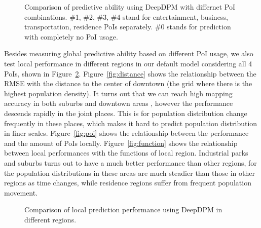 \documentclass[letterpaper]{article} %
\begin{document}
\begin{figure}[h]
    \centering

    \caption{Comparison of predictive ability using DeepDPM with differnet PoI combinations. \#1, \#2, \#3, \#4 stand for entertainment, business, transportation, residence PoIs separately. \#0 stands for prediction with completely no PoI usage.}
    \label{fig:poi_combination}
\end{figure}

Besides measuring global predictive ability based on different PoI usage, we also test local performance in different regions in our default model considering all 4 PoIs, shown in Figure~\ref{fig:variations}. Figure~\ref{fig:distance} shows the relationship between the RMSE with the distance to the center of downtown (the grid where there is the highest population density). It turns out that we can reach high mapping accuracy in both suburbs and downtown areas , however the performance descends rapidly in the joint places. This is for population distribution change frequently in these places, which makes it hard to predict population distribution in finer scales. Figure~\ref{fig:poi} shows the relationship between the performance and the amount of PoIs locally. Figure~\ref{fig:function} shows the relationship between local performances with the functions of local region. Industrial parks and suburbs turns out to have a much better performance than other regions, for the population distributions in these areas are much steadier than those in other regions as time changes, while residence regions suffer from frequent population movement. 

\begin{figure}[h]
    \centering
    \caption{Comparison of local prediction performance using DeepDPM in different regions.}
    \label{fig:variations}
\end{figure}
\end{document}
